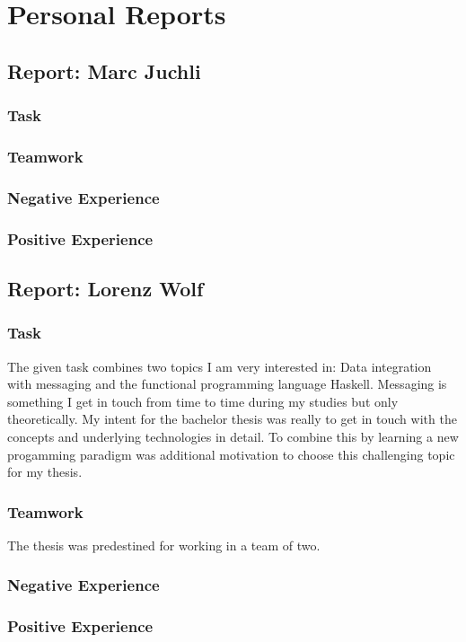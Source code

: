 \chapter{Personal Reports}

\section*{Report: Marc Juchli}

\subsection*{Task}
\subsection*{Teamwork}
\subsection*{Negative Experience}
\subsection*{Positive Experience}


\section*{Report: Lorenz Wolf}

\subsection*{Task}
The given task combines two topics I am very interested in: Data integration
with messaging and the functional programming language Haskell. Messaging is
something I get in touch from time to time during my studies but only
theoretically. My intent for the bachelor thesis was really to get in touch with
the concepts and underlying technologies in detail. To combine this by learning
a new progamming paradigm was additional motivation to choose this challenging
topic for my thesis.

\subsection*{Teamwork}
The thesis was predestined for working in a team of two. 

\subsection*{Negative Experience}
\subsection*{Positive Experience}


